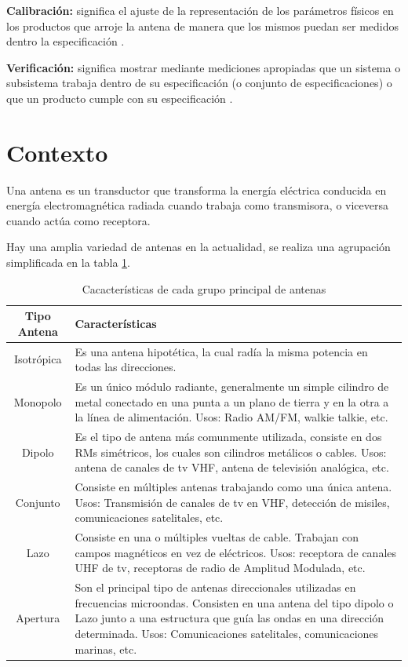 {\textbf{Calibración:}} significa el ajuste de la representación de los parámetros físicos en los productos que arroje la
antena de manera que los mismos puedan ser medidos dentro la especificación \cite{Mittermayer2007}.

{\textbf{Verificación:}} significa mostrar mediante mediciones apropiadas que un sistema o subsistema trabaja dentro de su
especificación (o conjunto de especificaciones) o que un producto cumple con su especificación \cite{Mittermayer2007}.

\section{Contexto} \label{sc:context}

Una antena es un transductor que transforma la energía eléctrica conducida en energía electromagnética radiada cuando
trabaja como transmisora, o viceversa cuando actúa como receptora.

Hay una amplia variedad de antenas en la actualidad, se realiza una agrupación simplificada en la tabla \ref{tab:type_antennas}.

\begin{table}[H]
  \footnotesize
  \centering
  \begin{tabular}{|c|p{9cm}|}
	\hline
	\textbf{Tipo Antena} & \textbf{Características} \\\hline
	Isotrópica & Es una antena hipotética, la cual radía la misma potencia en todas las direcciones.\\\hline
	Monopolo & Es un único módulo radiante, generalmente un simple cilindro de metal conectado en una punta a un plano de
	tierra y en la otra a la línea de alimentación. Usos: Radio AM/FM, walkie talkie, etc. \\\hline
	Dipolo & Es el tipo de antena más comunmente utilizada, consiste en dos RMs simétricos, los cuales son cilindros
	metálicos o cables. Usos: antena de canales de tv VHF, antena de televisión analógica, etc. \\\hline
	Conjunto & Consiste en múltiples antenas trabajando como una única antena. Usos: Transmisión de canales de tv en VHF,
	detección de misiles, comunicaciones satelitales, etc.\\\hline
	Lazo & Consiste en una o múltiples vueltas de cable. Trabajan con campos magnéticos en vez de eléctricos. Usos: receptora
	de canales UHF de tv, receptoras de radio de Amplitud Modulada, etc.\\\hline
	Apertura & Son el principal tipo de antenas direccionales utilizadas en frecuencias microondas. Consisten en una antena
	del tipo dipolo o Lazo junto a una estructura que guía las ondas en una dirección determinada. Usos: Comunicaciones
	satelitales, comunicaciones marinas, etc.\\\hline
  \end{tabular}
  \caption{Cacacterísticas de cada grupo principal de antenas}
  \label{tab:type_antennas}
\end{table}

